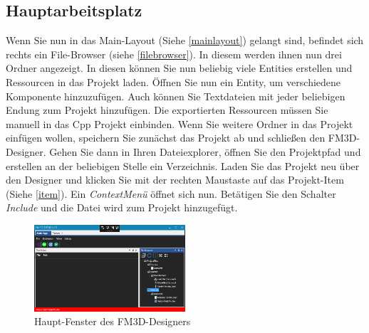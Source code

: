 \subsection{Hauptarbeitsplatz}
Wenn Sie nun in das Main-Layout (Siehe \cref{mainlayout}) gelangt sind, befindet sich rechts ein File-Browser (siehe \cref{filebrowser}). In diesem werden ihnen nun drei Ordner angezeigt. In diesen können Sie nun beliebig viele Entities erstellen und Ressourcen in das Projekt laden. Öffnen Sie nun ein Entity, um verschiedene Komponente hinzuzufügen.
Auch können Sie Textdateien mit jeder beliebigen Endung zum Projekt hinzufügen.
Die exportierten Ressourcen müssen Sie manuell in das Cpp Projekt einbinden.
Wenn Sie weitere Ordner in das Projekt einfügen wollen, speichern Sie zunächst das Projekt ab und schließen den FM3D-Designer. Gehen Sie dann in Ihren Dateiexplorer, öffnen Sie den Projektpfad und erstellen an der beliebigen Stelle ein Verzeichnis. Laden Sie das Projekt neu über den Designer und klicken Sie mit der rechten Maustaste auf das Projekt-Item (Siehe \cref{item}). Ein \textit{ContextMenü} öffnet sich nun. Betätigen Sie den Schalter \textit{Include} und die Datei wird zum Projekt hinzugefügt.
\begin{figure}
	\begin{center}
		\includegraphics[width=0.5\textwidth]{04verwendung/Designer/01workstation.PNG}
		\caption{Haupt-Fenster des FM3D-Designers}\label{arbeitsplatz}
	\end{center}
\end{figure}

